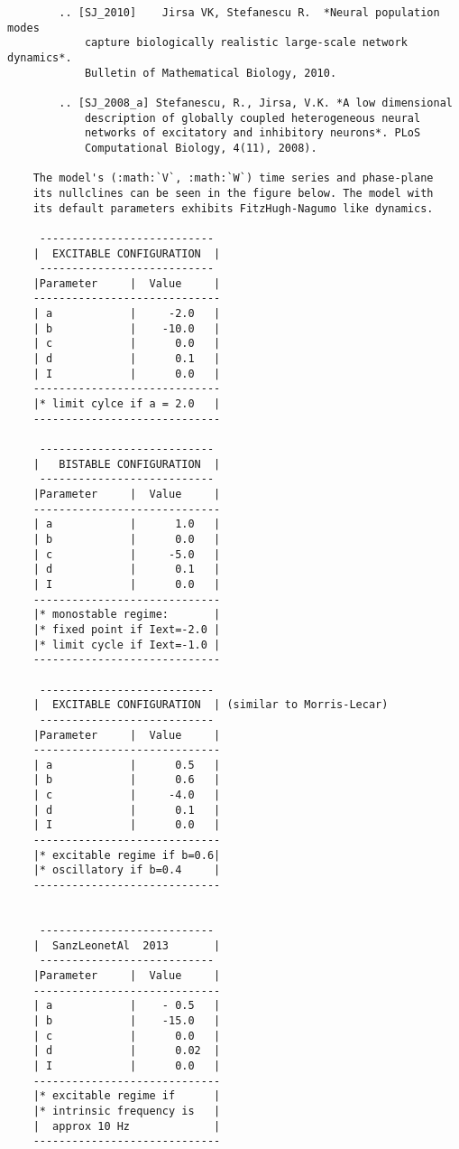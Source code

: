 \documentclass{article}
\begin{document}
\begin{lstlisting}
        .. [SJ_2010]    Jirsa VK, Stefanescu R.  *Neural population modes 
            capture biologically realistic large-scale network dynamics*. 
            Bulletin of Mathematical Biology, 2010.    

        .. [SJ_2008_a] Stefanescu, R., Jirsa, V.K. *A low dimensional 
            description of globally coupled heterogeneous neural 
            networks of excitatory and inhibitory neurons*. PLoS 
            Computational Biology, 4(11), 2008).

    The model's (:math:`V`, :math:`W`) time series and phase-plane 
    its nullclines can be seen in the figure below. The model with 
    its default parameters exhibits FitzHugh-Nagumo like dynamics.
    
     ---------------------------
    |  EXCITABLE CONFIGURATION  |
     ---------------------------
    |Parameter     |  Value     |
    -----------------------------
    | a            |     -2.0   |
    | b            |    -10.0   |
    | c            |      0.0   |
    | d            |      0.1   |
    | I            |      0.0   |
    -----------------------------
    |* limit cylce if a = 2.0   |
    -----------------------------
    
     ---------------------------
    |   BISTABLE CONFIGURATION  |
     ---------------------------
    |Parameter     |  Value     |
    -----------------------------
    | a            |      1.0   |
    | b            |      0.0   |
    | c            |     -5.0   |
    | d            |      0.1   |
    | I            |      0.0   |
    -----------------------------
    |* monostable regime:       |
    |* fixed point if Iext=-2.0 |
    |* limit cycle if Iext=-1.0 |
    -----------------------------
    
     ---------------------------
    |  EXCITABLE CONFIGURATION  | (similar to Morris-Lecar)
     ---------------------------
    |Parameter     |  Value     |
    -----------------------------
    | a            |      0.5   |
    | b            |      0.6   |
    | c            |     -4.0   |
    | d            |      0.1   |
    | I            |      0.0   |
    -----------------------------
    |* excitable regime if b=0.6|
    |* oscillatory if b=0.4     |
    -----------------------------
    
    
     ---------------------------
    |  SanzLeonetAl  2013       | 
     ---------------------------
    |Parameter     |  Value     |
    -----------------------------
    | a            |    - 0.5   |
    | b            |    -15.0   |
    | c            |      0.0   |
    | d            |      0.02  |
    | I            |      0.0   |
    -----------------------------
    |* excitable regime if      |
    |* intrinsic frequency is   |
    |  approx 10 Hz             |
    -----------------------------


\end{lstlisting}
\end{document}
